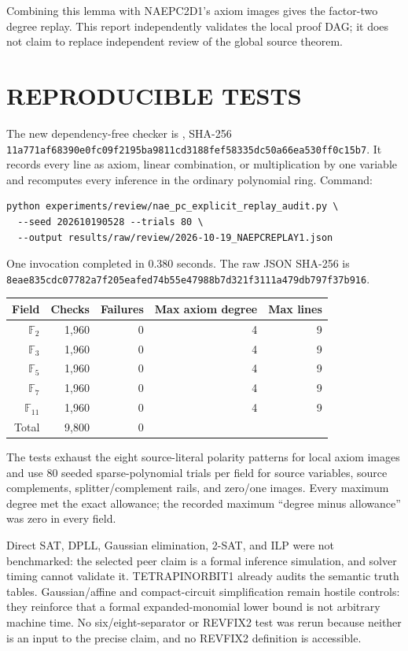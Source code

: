 \documentclass[11pt]{article}
\begin{document}
Combining this lemma with NAEPC2D1's axiom images gives the factor-two degree
replay.  This report independently validates the local proof DAG; it does not
claim to replace independent review of the global source theorem.

\section{REPRODUCIBLE TESTS}
The new dependency-free checker is
, SHA-256
\texttt{11a771af68390e0fc09f2195ba9811cd3188fef58335dc50a66ea530ff0c15b7}.
It records every line as axiom, linear combination, or multiplication by one
variable and recomputes every inference in the ordinary polynomial ring.
Command:
\begin{verbatim}
python experiments/review/nae_pc_explicit_replay_audit.py \
  --seed 202610190528 --trials 80 \
  --output results/raw/review/2026-10-19_NAEPCREPLAY1.json
\end{verbatim}
One invocation completed in 0.380 seconds.  The raw JSON SHA-256 is
\texttt{8eae835cdc07782a7f205eafed74b55e47988b7d321f3111a479db797f37b916}.

\begin{center}
\begin{tabular}{rrrrr}
\toprule
Field & Checks & Failures & Max axiom degree & Max lines\\
\midrule
$\mathbb F_2$&1,960&0&4&9\\
$\mathbb F_3$&1,960&0&4&9\\
$\mathbb F_5$&1,960&0&4&9\\
$\mathbb F_7$&1,960&0&4&9\\
$\mathbb F_{11}$&1,960&0&4&9\\
\midrule
Total&9,800&0&&\\
\bottomrule
\end{tabular}
\end{center}

The tests exhaust the eight source-literal polarity patterns for local axiom
images and use 80 seeded sparse-polynomial trials per field for source
variables, source complements, splitter/complement rails, and zero/one images.
Every maximum degree met the exact allowance; the recorded maximum
``degree minus allowance'' was zero in every field.

Direct SAT, DPLL, Gaussian elimination, 2-SAT, and ILP were not benchmarked:
the selected peer claim is a formal inference simulation, and solver timing
cannot validate it.  TETRAPINORBIT1 already audits the semantic truth tables.
Gaussian/affine and compact-circuit simplification remain hostile controls:
they reinforce that a formal expanded-monomial lower bound is not arbitrary
machine time.  No six/eight-separator or REVFIX2 test was rerun because neither
is an input to the precise claim, and no REVFIX2 definition is accessible.
\end{document}
